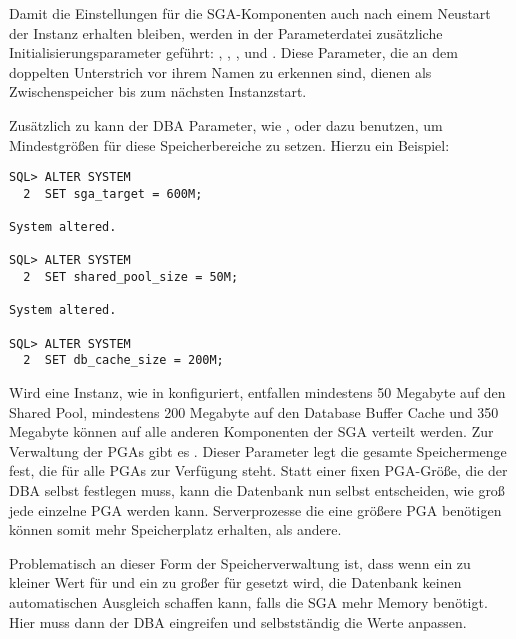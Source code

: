         Damit die Einstellungen für die SGA-Komponenten auch nach einem Neustart der Instanz erhalten bleiben, werden in der Parameterdatei zusätzliche Initialisierungsparameter geführt: , , ,  und . Diese Parameter, die an dem doppelten Unterstrich vor ihrem Namen zu erkennen sind, dienen als Zwischenspeicher bis zum nächsten Instanzstart.

        Zusätzlich zu  kann der DBA Parameter, wie ,  oder  dazu benutzen, um Mindestgrößen für diese Speicherbereiche zu setzen. Hierzu ein Beispiel:
        \begin{lstlisting}[caption={Ein Rechenbeispiel},label=admin23,language=oracle_sql]
SQL> ALTER SYSTEM
  2  SET sga_target = 600M;

System altered.

SQL> ALTER SYSTEM
  2  SET shared_pool_size = 50M;

System altered.

SQL> ALTER SYSTEM
  2  SET db_cache_size = 200M;
        \end{lstlisting}
        Wird eine Instanz, wie in  konfiguriert, entfallen mindestens 50 Megabyte auf den Shared Pool, mindestens 200 Megabyte auf den Database Buffer Cache und 350 Megabyte können auf alle anderen Komponenten der SGA verteilt werden.
        Zur Verwaltung der PGAs gibt es . Dieser Parameter legt die gesamte Speichermenge fest, die für alle PGAs zur Verfügung steht. Statt einer fixen PGA-Größe, die der DBA selbst festlegen muss, kann die Datenbank nun selbst entscheiden, wie groß jede einzelne PGA werden kann. Serverprozesse die eine größere PGA benötigen können somit mehr Speicherplatz erhalten, als andere.

        Problematisch an dieser Form der Speicherverwaltung ist, dass wenn ein zu kleiner Wert für  und ein zu großer für  gesetzt wird, die Datenbank keinen automatischen Ausgleich schaffen kann, falls die SGA mehr Memory benötigt. Hier muss dann der DBA eingreifen und selbstständig die Werte anpassen.
\clearpage      
